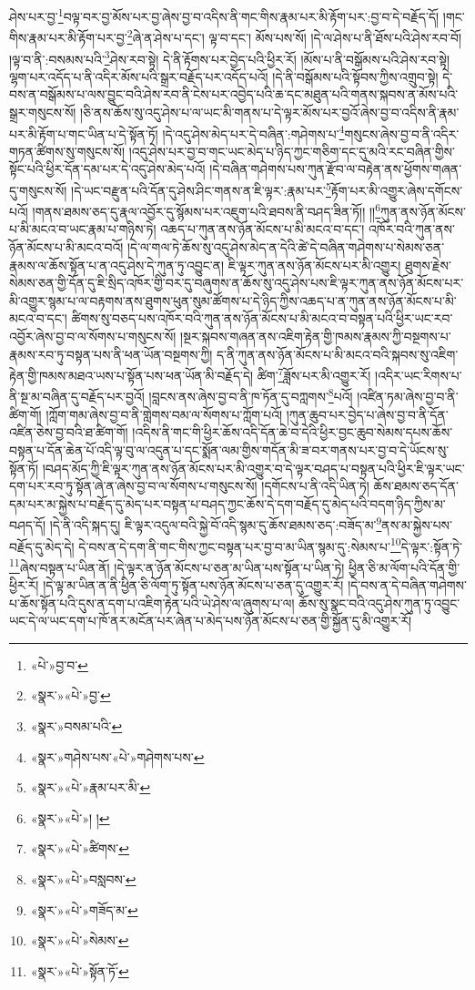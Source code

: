ཤེས་པར་བྱ་\footnote{«པེ་»བྱ་བ་}བལྟ་བར་བྱ་མོས་པར་བྱ་ཞེས་བྱ་བ་འདིས་ནི་གང་གིས་རྣམ་པར་མི་རྟོག་པར་:བྱ་བ་དེ་བརྗོད་དོ། །གང་གིས་རྣམ་པར་མི་རྟོག་པར་བྱ་\footnote{«སྣར་»«པེ་»བྱ་}ཞེ་ན་ཤེས་པ་དང་། ལྟ་བ་དང་། མོས་པས་སོ། །དེ་ལ་ཤེས་པ་ནི་ཐོས་པའི་ཤེས་རབ་བོ། །ལྟ་བ་ནི་:བསམས་པའི་\footnote{«སྣར་»བསམ་པའི་}ཤེས་རབ་སྟེ། དེ་ནི་རྟོགས་པར་བྱེད་པའི་ཕྱིར་རོ། །མོས་པ་ནི་བསྒོམས་པའི་ཤེས་རབ་སྟེ། ལྷག་པར་འདོད་པ་ནི་འདིར་མོས་པའི་སྒྲར་བརྗོད་པར་འདོད་པའོ། །དེ་ནི་བསྒོམས་པའི་སྟོབས་ཀྱིས་འགྲུབ་སྟེ། དེ་བས་ན་བསྒོམས་པ་ལས་བྱུང་བའི་ཤེས་རབ་ནི་ངེས་པར་འབྱེད་པའི་ཆ་དང་མཐུན་པའི་གནས་སྐབས་ན་མོས་པའི་སྒྲར་གསུངས་སོ། །ཅི་ནས་ཆོས་སུ་འདུ་ཤེས་པ་ལ་ཡང་མི་གནས་པ་དེ་ལྟར་མོས་པར་བྱའོ་ཞེས་བྱ་བ་འདིས་ནི་རྣམ་པར་མི་རྟོག་པ་གང་ཡིན་པ་དེ་སྟོན་ཏོ། །དེ་འདུ་ཤེས་མེད་པར་དེ་བཞིན་:གཤེགས་པ་\footnote{«སྣར་»གཤེས་པས་«པེ་»གཤེགས་པས་}གསུངས་ཞེས་བྱ་བ་ནི་འདིར་གཏན་ཚིགས་སུ་གསུངས་སོ། །འདུ་ཤེས་པར་བྱ་བ་གང་ཡང་མེད་པ་ཉིད་ཀྱང་གཅིག་དང་དུ་མའི་རང་བཞིན་གྱིས་སྟོང་པའི་ཕྱིར་དོན་དམ་པར་དེ་འདུ་ཤེས་མེད་པའོ། །དེ་བཞིན་གཤེགས་པས་ཀུན་རྫོབ་ལ་བརྟེན་ནས་ཕྱོགས་གཞན་དུ་གསུངས་སོ། །དེ་ཡང་བརྫུན་པའི་དོན་དུ་ཤེས་ཤིང་གནས་ན་ཇི་ལྟར་:རྣམ་པར་\footnote{«སྣར་»«པེ་»རྣམ་པར་མི་}རྟོག་པར་མི་འགྱུར་ཞེས་དགོངས་པའོ། །གནས་ཐམས་ཅད་དུ་རྣལ་འབྱོར་དུ་སྙོམས་པར་འཇུག་པའི་ཐབས་ནི་བཤད་ཟིན་ཏོ།། །།\footnote{«སྣར་»«པེ་»། །}ཀུན་ནས་ཉོན་མོངས་པ་མི་མངའ་བ་ཡང་རྣམ་པ་གཉིས་ཏེ། འཆད་པ་ཀུན་ནས་ཉོན་མོངས་པ་མི་མངའ་བ་དང་། འཁོར་བའི་ཀུན་ནས་ཉོན་མོངས་པ་མི་མངའ་བའོ། །དེ་ལ་གལ་ཏེ་ཆོས་སུ་འདུ་ཤེས་མེད་ན་དེའི་ཚེ་དེ་བཞིན་གཤེགས་པ་སེམས་ཅན་རྣམས་ལ་ཆོས་སྟོན་པ་ན་འདུ་ཤེས་དེ་ཀུན་ཏུ་འབྱུང་ན། ཇི་ལྟར་ཀུན་ནས་ཉོན་མོངས་པར་མི་འགྱུར། ཐུགས་རྗེས་སེམས་ཅན་གྱི་དོན་དུ་ཇི་སྲིད་འཁོར་གྱི་བར་དུ་བཞུགས་ན་ཆོས་སུ་འདུ་ཤེས་པས་ཇི་ལྟར་ཀུན་ནས་ཉོན་མོངས་པར་མི་འགྱུར་སྙམ་པ་ལ་བརྟགས་ནས་ཐུགས་ཕུན་སུམ་ཚོགས་པ་དེ་ཉིད་ཀྱིས་འཆད་པ་ན་ཀུན་ནས་ཉོན་མོངས་པ་མི་མངའ་བ་དང་། ཚིགས་སུ་བཅད་པས་འཁོར་བའི་ཀུན་ནས་ཉོན་མོངས་པ་མི་མངའ་བ་བསྟན་པའི་ཕྱིར་ཡང་རབ་འབྱོར་ཞེས་བྱ་བ་ལ་སོགས་པ་གསུངས་སོ། །སྔར་སྐབས་གཞན་ནས་འཇིག་རྟེན་གྱི་ཁམས་རྣམས་ཀྱི་བསྔགས་པ་རྣམས་རབ་ཏུ་བསྟན་པས་ནི་ཕན་ཡོན་བསྔགས་ཀྱི། ད་ནི་ཀུན་ནས་ཉོན་མོངས་པ་མི་མངའ་བའི་སྐབས་སུ་འཇིག་རྟེན་གྱི་ཁམས་མཐའ་ཡས་པ་སྟོན་པས་ཕན་ཡོན་མི་བརྗོད་དེ། ཚིག་\footnote{«སྣར་»«པེ་»ཚིགས་}ཟློས་པར་མི་འགྱུར་རོ། །འདིར་ཡང་རིགས་པ་ནི་སྔ་མ་བཞིན་དུ་བརྗོད་པར་བྱའོ། །བླངས་ནས་ཞེས་བྱ་བ་ནི་ཁ་ཏོན་དུ་བཀླགས་\footnote{«སྣར་»«པེ་»བསླབས་}པའོ། །འཛིན་ཏམ་ཞེས་བྱ་བ་ནི་ཚིག་གོ། །ཀློག་གམ་ཞེས་བྱ་བ་ནི་གླེགས་བམ་ལ་སོགས་པ་ཀློག་པའོ། །ཀུན་ཆུབ་པར་བྱེད་པ་ཞེས་བྱ་བ་ནི་དོན་འཛིན་ཅེས་བྱ་བའི་ཐ་ཚིག་གོ། །འདིས་ནི་གང་གི་ཕྱིར་ཆོས་འདི་དོན་ཆེ་བ་དེའི་ཕྱིར་བྱང་ཆུབ་སེམས་དཔས་ཆོས་བསྟན་པ་དོན་ཆེན་པོ་འདི་ལྟ་བུ་ལ་འདུན་པ་དང་སྨོན་ལམ་གྱིས་གདོན་མི་ཟ་བར་གནས་པར་བྱ་བ་དེ་ཡོངས་སུ་སྟོན་ཏོ། །བཤད་མོད་ཀྱི་ཇི་ལྟར་ཀུན་ནས་ཉོན་མོངས་པར་མི་འགྱུར་བ་དེ་ལྟར་བཤད་པ་བསྟན་པའི་ཕྱིར་ཇི་ལྟར་ཡང་དག་པར་རབ་ཏུ་སྟོན་ཞེ་ན་ཞེས་བྱ་བ་ལ་སོགས་པ་གསུངས་སོ། །དགོངས་པ་ནི་འདི་ཡིན་ཏེ། ཆོས་ཐམས་ཅད་དོན་དམ་པར་མ་སྐྱེས་པ་བརྗོད་དུ་མེད་པར་བསྟན་པ་བཤད་ཀྱང་ཆོས་དེ་དག་བརྗོད་དུ་མེད་པའི་བདག་ཉིད་ཀྱིས་མ་བཤད་དོ། །དེ་ནི་འདི་སྐད་དུ། ཇི་ལྟར་འདུལ་བའི་སྐྱེ་བོ་འདི་སྙམ་དུ་ཆོས་ཐམས་ཅད་:བཟོད་མ་\footnote{«སྣར་»«པེ་»གཟོད་མ་}ནས་མ་སྐྱེས་པས་བརྗོད་དུ་མེད་དེ། དེ་བས་ན་དེ་དག་ནི་གང་གིས་ཀྱང་བསྟན་པར་བྱ་བ་མ་ཡིན་སྙམ་དུ་:སེམས་པ་\footnote{«སྣར་»«པེ་»སེམས་}དེ་ལྟར་:སྟོན་ཏེ་\footnote{«སྣར་»«པེ་»སྟོན་ཏོ་}ཞེས་བསྟན་པ་ཡིན་ནོ། །དེ་ལྟར་ན་ཉོན་མོངས་པ་ཅན་མ་ཡིན་པས་སྟོན་པ་ཡིན་ཏེ། ཕྱིན་ཅི་མ་ལོག་པའི་དོན་གྱི་ཕྱིར་རོ། །དེ་ལྟ་མ་ཡིན་ན་ནི་ཕྱིན་ཅི་ལོག་ཏུ་སྟོན་པས་ཉོན་མོངས་པ་ཅན་དུ་འགྱུར་རོ། །དེ་བས་ན་དེ་བཞིན་གཤེགས་པ་ཆོས་སྟོན་པའི་དུས་ན་དག་པ་འཇིག་རྟེན་པའི་ཡེ་ཤེས་ལ་ཞུགས་པ་ལ། ཆོས་སུ་སྣང་བའི་འདུ་ཤེས་ཀུན་ཏུ་འབྱུང་ཡང་དེ་ལ་ཡང་དག་པ་ཁོ་ནར་མངོན་པར་ཞེན་པ་མེད་པས་ཉོན་མོངས་པ་ཅན་གྱི་སྐྱོན་དུ་མི་འགྱུར་རོ། 